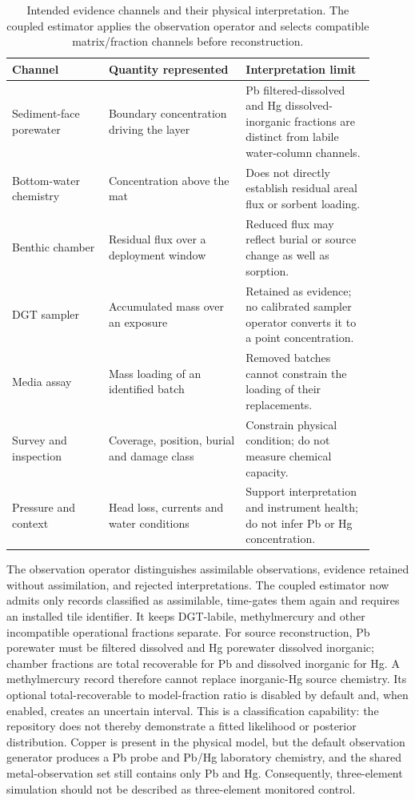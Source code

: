 \begin{table}[htbp]
\centering\small
\caption{Intended evidence channels and their physical interpretation. The coupled estimator applies the observation operator and selects compatible matrix/fraction channels before reconstruction.}
\label{tab:monitoring-channels}
\begin{tabular}{p{0.24\linewidth}p{0.34\linewidth}p{0.32\linewidth}}
\toprule
Channel & Quantity represented & Interpretation limit \\
\midrule
Sediment-face porewater & Boundary concentration driving the layer & Pb filtered-dissolved and Hg dissolved-inorganic fractions are distinct from labile water-column channels. \\
Bottom-water chemistry & Concentration above the mat & Does not directly establish residual areal flux or sorbent loading. \\
Benthic chamber & Residual flux over a deployment window & Reduced flux may reflect burial or source change as well as sorption. \\
DGT sampler & Accumulated mass over an exposure & Retained as evidence; no calibrated sampler operator converts it to a point concentration. \\
Media assay & Mass loading of an identified batch & Removed batches cannot constrain the loading of their replacements. \\
Survey and inspection & Coverage, position, burial and damage class & Constrain physical condition; do not measure chemical capacity. \\
Pressure and context & Head loss, currents and water conditions & Support interpretation and instrument health; do not infer Pb or Hg concentration. \\
\bottomrule
\end{tabular}
\end{table}

The observation operator distinguishes assimilable observations, evidence retained without assimilation, and rejected interpretations. The coupled estimator now admits only records classified as assimilable, time-gates them again and requires an installed tile identifier. It keeps DGT-labile, methylmercury and other incompatible operational fractions separate. For source reconstruction, Pb porewater must be filtered dissolved and Hg porewater dissolved inorganic; chamber fractions are total recoverable for Pb and dissolved inorganic for Hg. A methylmercury record therefore cannot replace inorganic-Hg source chemistry. Its optional total-recoverable to model-fraction ratio is disabled by default and, when enabled, creates an uncertain interval. This is a classification capability: the repository does not thereby demonstrate a fitted likelihood or posterior distribution. Copper is present in the physical model, but the default observation generator produces a Pb probe and Pb/Hg laboratory chemistry, and the shared metal-observation set still contains only Pb and Hg. Consequently, three-element simulation should not be described as three-element monitored control.

